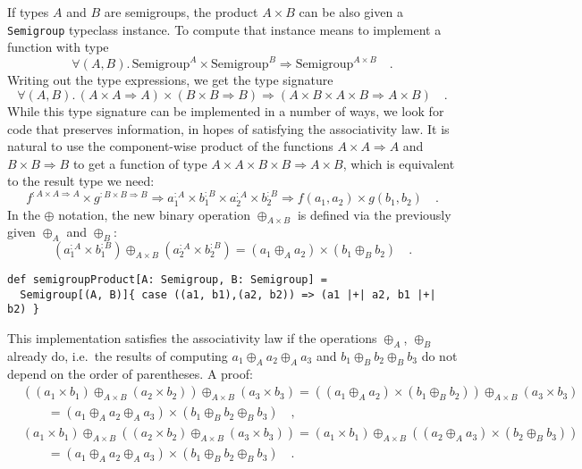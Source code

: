 If types $A$ and $B$ are semigroups, the product $A\times B$ can
be also given a \lstinline!Semigroup! typeclass instance. To compute
that instance means to implement a function with type
\[
\forall(A,B).\,\text{Semigroup}^{A}\times\text{Semigroup}^{B}\Rightarrow\text{Semigroup}^{A\times B}\quad.
\]
Writing out the type expressions, we get the type signature
\[
\forall(A,B).\,\left(A\times A\Rightarrow A\right)\times\left(B\times B\Rightarrow B\right)\Rightarrow\left(A\times B\times A\times B\Rightarrow A\times B\right)\quad.
\]
While this type signature can be implemented in a number of ways,
we look for code that preserves information, in hopes of satisfying
the associativity law. It is natural to use the component-wise product
of the functions $A\times A\Rightarrow A$ and $B\times B\Rightarrow B$
to get a function of type $A\times A\times B\times B\Rightarrow A\times B$,
which is equivalent to the result type we need:
\[
f^{:A\times A\Rightarrow A}\times g^{:B\times B\Rightarrow B}\Rightarrow a_{1}^{:A}\times b_{1}^{:B}\times a_{2}^{:A}\times b_{2}^{:B}\Rightarrow f(a_{1},a_{2})\times g(b_{1},b_{2})\quad.
\]
In the $\oplus$ notation, the new binary operation $\oplus_{A\times B}$
is defined via the previously given $\oplus_{A}$ and $\oplus_{B}$:
\[
(a_{1}^{:A}\times b_{1}^{:B})\oplus_{A\times B}(a_{2}^{:A}\times b_{2}^{:B})=(a_{1}\oplus_{A}a_{2})\times(b_{1}\oplus_{B}b_{2})\quad.
\]
\begin{lstlisting}
def semigroupProduct[A: Semigroup, B: Semigroup] =
  Semigroup[(A, B)]{ case ((a1, b1),(a2, b2)) => (a1 |+| a2, b1 |+| b2) }
\end{lstlisting}
This implementation satisfies the associativity law if the operations
$\oplus_{A}$, $\oplus_{B}$ already do, i.e.~the results of computing
$a_{1}\oplus_{A}a_{2}\oplus_{A}a_{3}$ and $b_{1}\oplus_{B}b_{2}\oplus_{B}b_{3}$
do not depend on the order of parentheses. A proof:
\begin{align*}
 & \left(\left(a_{1}\times b_{1}\right)\oplus_{A\times B}\left(a_{2}\times b_{2}\right)\right)\oplus_{A\times B}\left(a_{3}\times b_{3}\right)=\left((a_{1}\oplus_{A}a_{2})\times(b_{1}\oplus_{B}b_{2})\right)\oplus_{A\times B}\left(a_{3}\times b_{3}\right)\\
 & \quad\quad=\left(a_{1}\oplus_{A}a_{2}\oplus_{A}a_{3}\right)\times\left(b_{1}\oplus_{B}b_{2}\oplus_{B}b_{3}\right)\quad,\\
 & \left(a_{1}\times b_{1}\right)\oplus_{A\times B}\left(\left(a_{2}\times b_{2}\right)\oplus_{A\times B}\left(a_{3}\times b_{3}\right)\right)=\left(a_{1}\times b_{1}\right)\oplus_{A\times B}\left((a_{2}\oplus_{A}a_{3})\times(b_{2}\oplus_{B}b_{3})\right)\\
 & \quad\quad=\left(a_{1}\oplus_{A}a_{2}\oplus_{A}a_{3}\right)\times\left(b_{1}\oplus_{B}b_{2}\oplus_{B}b_{3}\right)\quad.
\end{align*}


